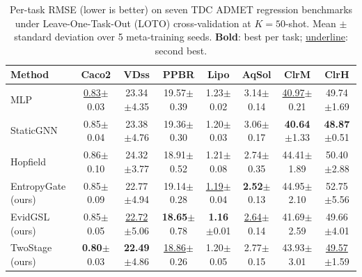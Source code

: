 \begin{table}[t]
\centering
\small
\caption{Per-task RMSE (lower is better) on seven TDC ADMET regression benchmarks under Leave-One-Task-Out (LOTO) cross-validation at $K=50$-shot. Mean $\pm$ standard deviation over 5 meta-training seeds. \textbf{Bold}: best per task; \underline{underline}: second best.}
\label{tab:main_k50}
\begin{tabular}{lccccccc}
\toprule
Method & Caco2 & VDss & PPBR & Lipo & AqSol & ClrM & ClrH \\
\midrule
MLP & \underline{0.83}$\pm$0.03 & 23.34$\pm$4.35 & 19.57$\pm$0.39 & 1.23$\pm$0.02 & 3.14$\pm$0.14 & \underline{40.97}$\pm$0.21 & 49.74$\pm$1.69 \\
StaticGNN & 0.85$\pm$0.04 & 23.38$\pm$4.76 & 19.36$\pm$0.30 & 1.20$\pm$0.03 & 3.06$\pm$0.17 & \textbf{40.64}$\pm$1.33 & \textbf{48.87}$\pm$0.51 \\
Hopfield & 0.86$\pm$0.10 & 24.32$\pm$3.77 & 18.91$\pm$0.52 & 1.21$\pm$0.08 & 2.74$\pm$0.35 & 44.41$\pm$1.89 & 50.40$\pm$2.88 \\
\midrule
EntropyGate (ours) & 0.85$\pm$0.09 & 22.77$\pm$4.94 & 19.14$\pm$0.28 & \underline{1.19}$\pm$0.04 & \textbf{2.52}$\pm$0.13 & 44.95$\pm$2.10 & 52.75$\pm$5.56 \\
EvidGSL (ours) & 0.85$\pm$0.05 & \underline{22.72}$\pm$5.06 & \textbf{18.65}$\pm$0.78 & \textbf{1.16}$\pm$0.01 & \underline{2.64}$\pm$0.14 & 41.69$\pm$2.59 & 49.66$\pm$4.01 \\
TwoStage (ours) & \textbf{0.80}$\pm$0.03 & \textbf{22.49}$\pm$4.86 & \underline{18.86}$\pm$0.26 & 1.20$\pm$0.05 & 2.77$\pm$0.15 & 43.93$\pm$3.01 & \underline{49.57}$\pm$1.59 \\
\bottomrule
\end{tabular}
\end{table}
